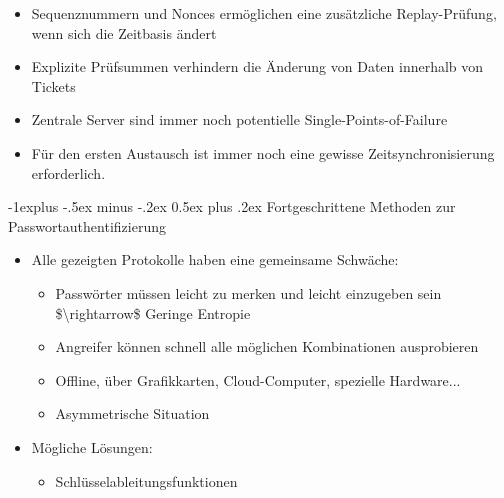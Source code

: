 \documentclass[a4paper]{article}
\makeatletter
\renewcommand{\subsection}{\@startsection{subsection}{2}{0mm}%
 {-1explus -.5ex minus -.2ex}%
 {0.5ex plus .2ex}%
 {\normalfont\normalsize\bfseries}}
\makeatother
\begin{document}
\begin{multicols}{3}
\begin{itemize}
              \begin{itemize}
                  \item
                        Sequenznummern und Nonces ermöglichen eine zusätzliche
                        Replay-Prüfung, wenn sich die Zeitbasis ändert
                  \item
                        Explizite Prüfsummen verhindern die Änderung von Daten innerhalb von
                        Tickets
                  \item
                        Zentrale Server sind immer noch potentielle Single-Points-of-Failure
                  \item
                        Für den ersten Austausch ist immer noch eine gewisse
                        Zeitsynchronisierung erforderlich.
              \end{itemize}
    \end{itemize}


    \subsection{Fortgeschrittene Methoden zur
        Passwortauthentifizierung}

    \begin{itemize}
        \item
              Alle gezeigten Protokolle haben eine gemeinsame Schwäche:

              \begin{itemize}
                  \item
                        Passwörter müssen leicht zu merken und leicht einzugeben sein
                        \$\textbackslash rightarrow\$ Geringe Entropie
                  \item
                        Angreifer können schnell alle möglichen Kombinationen ausprobieren
                  \item
                        Offline, über Grafikkarten, Cloud-Computer, spezielle Hardware...
                  \item
                        Asymmetrische Situation
              \end{itemize}
        \item
              Mögliche Lösungen:

              \begin{itemize}
                  \item
                        Schlüsselableitungsfunktionen


\end{itemize}
\end{itemize}
\end{multicols}
\end{document}
